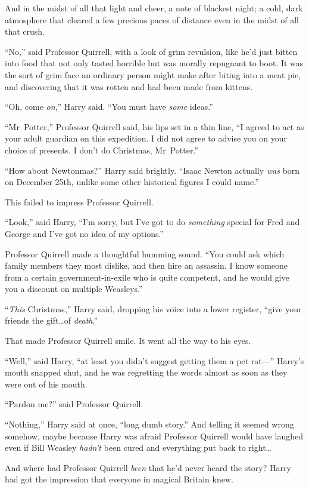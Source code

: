 And in the midst of all that light and cheer, a note of blackest night; a cold, dark atmosphere that cleared a few precious paces of distance even in the midst of all that crush.

“No,” said Professor Quirrell, with a look of grim revulsion, like he’d just bitten into food that not only tasted horrible but was morally repugnant to boot. It was the sort of grim face an ordinary person might make after biting into a meat pie, and discovering that it was rotten and had been made from kittens.

“Oh, come \emph{on},” Harry said. “You must have \emph{some} ideas.”

“Mr~Potter,” Professor Quirrell said, his lips set in a thin line, “I agreed to act as your adult guardian on this expedition. I did not agree to advise you on your choice of presents. I don’t do Christmas, Mr~Potter.”

“How about Newtonmas?” Harry said brightly. “Isaac Newton actually \emph{was} born on December 25th, unlike some other historical figures I could name.”

This failed to impress Professor Quirrell.

“Look,” said Harry, “I’m sorry, but I’ve got to do \emph{something} special for Fred and George and I’ve got no idea of my options.”

Professor Quirrell made a thoughtful humming sound. “You could ask which family members they most dislike, and then hire an assassin. I know someone from a certain government-in-exile who is quite competent, and he would give you a discount on multiple Weasleys.”

“\emph{This} Christmas,” Harry said, dropping his voice into a lower register, “give your friends the gift…of \emph{death}.”

That made Professor Quirrell smile. It went all the way to his eyes.

“Well,” said Harry, “at least you didn’t suggest getting them a pet rat—” Harry’s mouth snapped shut, and he was regretting the words almost as soon as they were out of his mouth.

“Pardon me?” said Professor Quirrell.

“Nothing,” Harry said at once, “long dumb story.” And telling it seemed wrong somehow, maybe because Harry was afraid Professor Quirrell would have laughed even if Bill Weasley \emph{hadn’t} been cured and everything put back to right…

And where had Professor Quirrell \emph{been} that he’d never heard the story? Harry had got the impression that everyone in magical Britain knew.

